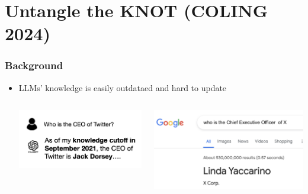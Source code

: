 \documentclass{beamer}
\begin{document}
\section{Untangle the KNOT (COLING 2024)}
\begin{frame}
\frametitle{Background}
\begin{itemize}
    \item LLMs' knowledge is easily outdataed and hard to update 
    \begin{columns}
        \begin{center}
            \includegraphics[width=\textwidth]{figure/knot-twitter-ceo-example.png}
        \end{center}
        \begin{center}
            \includegraphics[width=\textwidth]{figure/knot-twitter-ex-by-google.png}
        \end{center}
    \end{columns}


\end{itemize}
\end{frame}
\end{document}
